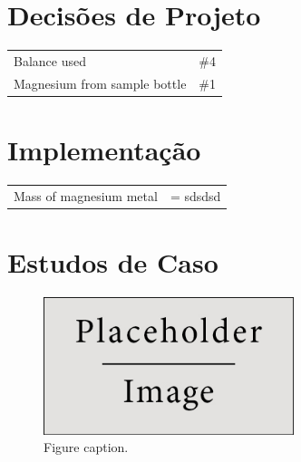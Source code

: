 \documentclass[a4paper,12pt]{article}
\begin{document}
        
        \section{Decisões de Projeto}
        
            \begin{tabular}{ll}
                Balance used & \#4\\
                Magnesium from sample bottle & \#1
            \end{tabular}
        
        
        \section{Implementação}
        
            \begin{tabular}{ll}
                Mass of magnesium metal & = sdsdsd
            \end{tabular}
            
        
        \section{Estudos de Caso}
        
        
        \begin{figure}[h]
            \begin{center}
                \includegraphics[width=0.65\textwidth]{placeholder_1} %
                \caption{Figure caption.}
            \end{center}
        \end{figure}
        
\end{document}

